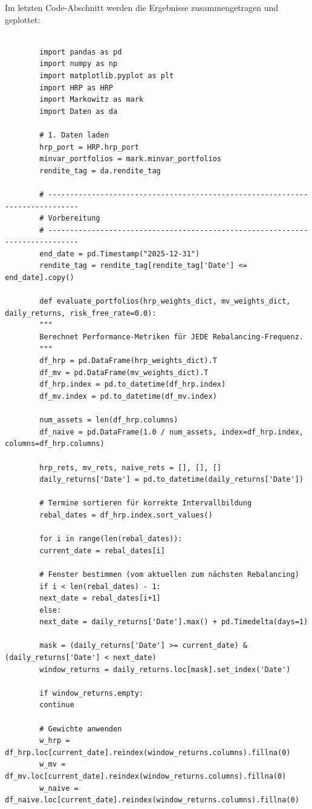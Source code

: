 \documentclass[parskip=half]{scrartcl}
\begin{document}
	Im letzten Code-Abschnitt werden die Ergebnisse zusammengetragen und geplottet:
	
	\begin{lstlisting}[caption={Auswertung und Plots}, label={lst:vgl_code}]
		
		import pandas as pd
		import numpy as np
		import matplotlib.pyplot as plt
		import HRP as HRP
		import Markowitz as mark
		import Daten as da
		
		# 1. Daten laden
		hrp_port = HRP.hrp_port
		minvar_portfolios = mark.minvar_portfolios
		rendite_tag = da.rendite_tag
		
		# -----------------------------------------------------------------------------
		# Vorbereitung
		# -----------------------------------------------------------------------------
		end_date = pd.Timestamp("2025-12-31")
		rendite_tag = rendite_tag[rendite_tag['Date'] <= end_date].copy()
		
		def evaluate_portfolios(hrp_weights_dict, mv_weights_dict, daily_returns, risk_free_rate=0.0):
		"""
		Berechnet Performance-Metriken für JEDE Rebalancing-Frequenz.
		"""
		df_hrp = pd.DataFrame(hrp_weights_dict).T
		df_mv = pd.DataFrame(mv_weights_dict).T
		df_hrp.index = pd.to_datetime(df_hrp.index)
		df_mv.index = pd.to_datetime(df_mv.index)
		
		num_assets = len(df_hrp.columns)
		df_naive = pd.DataFrame(1.0 / num_assets, index=df_hrp.index, columns=df_hrp.columns)
		
		hrp_rets, mv_rets, naive_rets = [], [], []
		daily_returns['Date'] = pd.to_datetime(daily_returns['Date'])
		
		# Termine sortieren für korrekte Intervallbildung
		rebal_dates = df_hrp.index.sort_values()
		
		for i in range(len(rebal_dates)):
		current_date = rebal_dates[i]
		
		# Fenster bestimmen (vom aktuellen zum nächsten Rebalancing)
		if i < len(rebal_dates) - 1:
		next_date = rebal_dates[i+1]
		else:
		next_date = daily_returns['Date'].max() + pd.Timedelta(days=1)
		
		mask = (daily_returns['Date'] >= current_date) & (daily_returns['Date'] < next_date)
		window_returns = daily_returns.loc[mask].set_index('Date')
		
		if window_returns.empty:
		continue
		
		# Gewichte anwenden
		w_hrp = df_hrp.loc[current_date].reindex(window_returns.columns).fillna(0)
		w_mv = df_mv.loc[current_date].reindex(window_returns.columns).fillna(0)
		w_naive = df_naive.loc[current_date].reindex(window_returns.columns).fillna(0)
		

\end{lstlisting}
\end{document}
